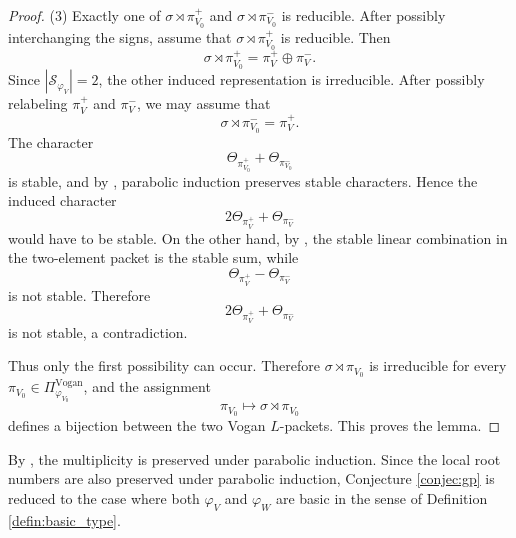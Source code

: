 \documentclass[12pt]{amsart}
\numberwithin{equation}{subsection}
\newcommand{\CS}{{\mathcal {S}}}
\def\vphi{\varphi}
\begin{document}
\begin{proof}
(3) Exactly one of $\sigma\rtimes \pi_{V_0}^+$ and $\sigma\rtimes \pi_{V_0}^-$ is reducible. After possibly interchanging the signs, assume that $\sigma\rtimes \pi_{V_0}^+$ is reducible. Then
    \[
    \sigma\rtimes \pi_{V_0}^+=\pi_{V}^+\oplus\pi_{V}^-.
    \]
    Since $|\CS_{\vphi_V}|=2$, the other induced representation is irreducible. After possibly relabeling $\pi_V^+$ and $\pi_V^-$, we may assume that
    \[
    \sigma\rtimes \pi_{V_0}^-=\pi_V^+.
    \]
    The character
    \[
    \Theta_{\pi_{V_0}^+}+\Theta_{\pi_{V_0}^-}
    \]
    is stable, and by \cite[Lem.~12.13]{adams1998lifting}, parabolic induction preserves stable characters. Hence the induced character
    \[
    2\Theta_{\pi_V^+}+\Theta_{\pi_V^-}
    \]
    would have to be stable. On the other hand, by \cite[Cor.~11.7]{shelstad2008tempered}, the stable linear combination in the two-element packet is the stable sum, while
    \[
    \Theta_{\pi_V^+}-\Theta_{\pi_V^-}
    \]
    is not stable. Therefore
    \[
    2\Theta_{\pi_V^+}+\Theta_{\pi_V^-}
    \]
    is not stable, a contradiction.

Thus only the first possibility can occur. Therefore $\sigma\rtimes \pi_{V_0}$ is irreducible for every $\pi_{V_0}\in \Pi_{\varphi_{V_0}}^{\mathrm{Vogan}}$, and the assignment
\[
\pi_{V_0}\mapsto \sigma\rtimes \pi_{V_0}
\]
defines a bijection between the two Vogan $L$-packets. This proves the lemma.
\end{proof}

By \cite[Cor.~7.3.1]{thesis_zhilin}, the multiplicity is preserved under parabolic induction. Since the local root numbers are also preserved under parabolic induction, Conjecture \ref{conjec:gp} is reduced to the case where both $\varphi_V$ and $\varphi_W$ are basic in the sense of Definition \ref{defin:basic_type}.
\end{document}
